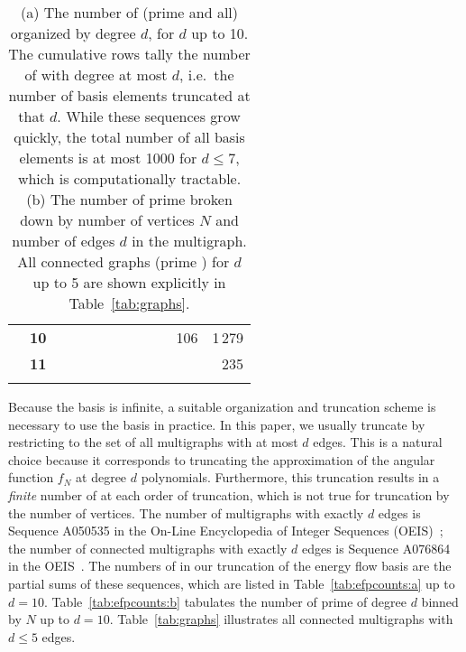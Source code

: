 \documentclass[letterpaper,11pt]{article}
\DeclareRobustCommand{\Tab}[1]{Table~\ref{#1}}
\newcommand{\B}{\text{EFP}\xspace}
\newcommand{\Bs}{\text{EFPs}\xspace}
\begin{document}
\begin{table}[t]
{\begin{tabular}{|cc||rrrrrrrrrr|}
        & \bf10 &  &    &    &    &      &      &        &        & 106     & 1\,279 \\
        & \bf11 &  &    &     &    &     &       &       &        &            & 235     \\ \hhline{|--||*{10}{-}|} 
\end{tabular}}
%
\caption{(a) The number of \Bs (prime and all) organized by degree $d$, for $d$ up to 10. The cumulative rows tally the number of \Bs with degree at most $d$, i.e.\ the number of basis elements truncated at that $d$. While these sequences grow quickly, the total number of all basis elements is at most 1000 for $d\le7$, which is computationally tractable. (b) The number of prime \Bs broken down by number of vertices $N$ and number of edges $d$ in the multigraph.  All connected graphs (prime \Bs) for $d$ up to 5 are shown explicitly in \Tab{tab:graphs}.}
\label{tab:efpcounts}
\end{table}

Because the \B basis is infinite, a suitable organization and truncation scheme is necessary to use the basis in practice.
%
In this paper, we usually truncate by restricting to the set of all multigraphs with at most $d$ edges.
%
This is a natural choice because it corresponds to truncating the approximation of the angular function $f_N$ at degree $d$ polynomials.
%
Furthermore, this truncation results in a \emph{finite} number of \Bs at each order of truncation, which is not true for truncation by the number of vertices.
%
The number of multigraphs with exactly $d$ edges is Sequence A050535 in the On-Line Encyclopedia of Integer Sequences (OEIS)~\cite{sloane2007line,harary2014graphical}; the number of connected multigraphs with exactly $d$ edges is Sequence A076864 in the OEIS~\cite{sloane2007line}.
%
The numbers of \Bs in our truncation of the energy flow basis are the partial sums of these sequences, which are listed in \Tab{tab:efpcounts:a} up to $d=10$.
%
\Tab{tab:efpcounts:b} tabulates the number of prime \Bs of degree $d$ binned by $N$ up to $d=10$.
%
\Tab{tab:graphs} illustrates all connected multigraphs with $d\le 5$ edges.
\end{document}
